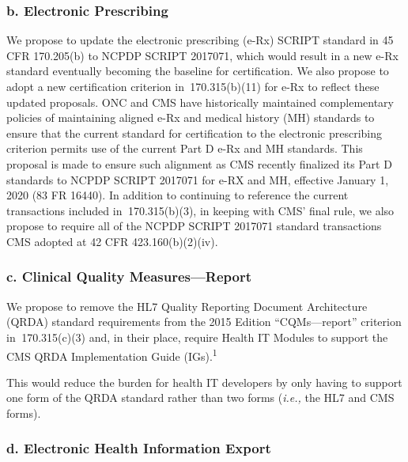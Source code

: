 \documentclass[twoside,11pt]{article}
\begin{document}
          \subsubsection{b. Electronic Prescribing}

          We propose to update the electronic prescribing (e-Rx) SCRIPT standard in 45 CFR 170.205(b) to NCPDP SCRIPT 2017071, which would result in a new e-Rx standard eventually becoming the baseline for certification. We also propose to adopt a new certification criterion in \textsection{} 170.315(b)(11) for e-Rx to reflect these updated proposals. ONC and CMS have historically maintained complementary policies of maintaining aligned e-Rx and medical history (MH) standards to ensure that the current standard for certification to the electronic prescribing criterion permits use of the current Part D e-Rx and MH standards. This proposal is made to ensure such alignment as CMS recently finalized its Part D standards to NCPDP SCRIPT 2017071 for e-RX and MH, effective January 1, 2020 (83 FR 16440). In addition to continuing to reference the current transactions included in \textsection{} 170.315(b)(3), in keeping with CMS' final rule, we also propose to require all of the NCPDP SCRIPT 2017071 standard transactions CMS adopted at 42 CFR 423.160(b)(2)(iv).


          \subsubsection{c. Clinical Quality Measures—Report}

          We propose to remove the HL7 Quality Reporting Document Architecture (QRDA) standard requirements from the 2015 Edition “CQMs—report” criterion in \textsection{} 170.315(c)(3) and, in their place, require Health IT Modules to support the CMS QRDA Implementation Guide (IGs).\textsuperscript{1}

             This would reduce the burden for health IT developers by only having to support one form of the QRDA standard rather than two forms (\emph{i.e.,} the HL7 and CMS forms).




          \subsubsection{d. Electronic Health Information Export}
\end{document}
